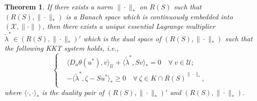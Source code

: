\documentclass[leqno]{amsart}
\newtheorem{theorem}{Theorem}[section]
\theoremstyle{definition}
\begin{document}
%

\begin{theorem}\label{thm:Rcl}
If there exists  a norm  $\|\cdot\|_*$ on $R(S)$ such that $(R(S), \|\cdot\|_*)$ is a Banach space which is continuously embedded into $(\mathcal{X}, \|\cdot\|)$, then there exists a unique essential Lagrange multiplier $\tilde{\lambda}^*\in (R(S), \|\cdot\|_*)'$ which is the dual space of $(R(S), \|\cdot\|_*)$ such that the following KKT system holds, i.e.,
\begin{equation}\label{eq:eKKT_wB}
\left\{
\begin{aligned}
& \langle D_u\theta(u^*), v\rangle_\mathcal{U}  + \langle \tilde{\lambda}^*, Sv\rangle_{*} = 0\quad \forall\ v\in \mathcal{U};\\
& - \langle\tilde{\lambda}^* ,\zeta - Su^*\rangle_*\geq 0\quad \forall\ \zeta\in \overline{K\cap R(S)}^{\|\cdot\|_*}, \\
\end{aligned}
\right.
\end{equation}
where $\langle\cdot,\cdot\rangle_*$ is the duality pair of $(R(S), \|\cdot\|_*)'$ and $(R(S), \|\cdot\|_*)$. 
\end{theorem}
\end{document}
